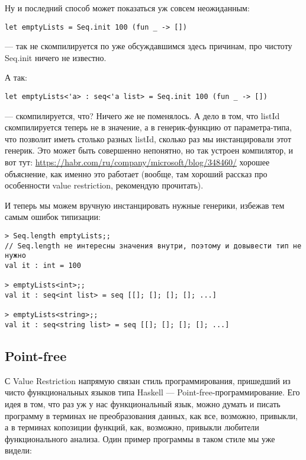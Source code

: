 \documentclass{../../text-style}
\begin{document}
Ну и последний способ может показаться уж совсем неожиданным:

\begin{verbatim}
let emptyLists = Seq.init 100 (fun _ -> [])
\end{verbatim}

--- так не скомпилируется по уже обсуждавшимся здесь причинам, про чистоту Seq.init ничего не известно.

А так:

\begin{verbatim}
let emptyLists<'a> : seq<'a list> = Seq.init 100 (fun _ -> [])
\end{verbatim}

--- скомпилируется, что? Ничего же не поменялось. А дело в том, что listId скомпилируется теперь не в значение, а в генерик-функцию от параметра-типа, что позволит иметь столько разных listId, сколько раз мы инстанцировали этот генерик. Это может быть совершенно непонятно, но так устроен компилятор, и вот тут: \url{https://habr.com/ru/company/microsoft/blog/348460/} хорошее объяснение, как именно это работает (вообще, там хороший рассказ про особенности value restriction, рекомендую прочитать).

И теперь мы можем вручную инстанцировать нужные генерики, избежав тем самым ошибок типизации:

\begin{verbatim}
> Seq.length emptyLists;;
// Seq.length не интересны значения внутри, поэтому и довывести тип не нужно
val it : int = 100

> emptyLists<int>;;
val it : seq<int list> = seq [[]; []; []; []; ...]

> emptyLists<string>;;
val it : seq<string list> = seq [[]; []; []; []; ...]
\end{verbatim}

\subsection{Point-free}

С Value Restriction напрямую связан стиль программирования, пришедший из чисто функциональных языков типа Haskell --- Point-free-программирование. Его идея в том, что раз уж у нас функциональный язык, можно думать и писать программу в терминах не преобразования данных, как все, возможно, привыкли, а в терминах копозиции функций, как, возможно, привыкли любители функционального анализа. Один пример программы в таком стиле мы уже видели:
\end{document}
